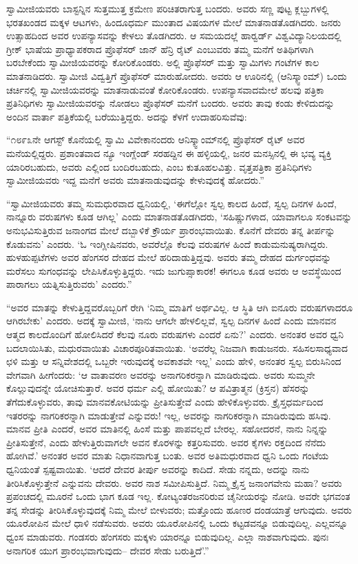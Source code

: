  ಸ್ವಾಮೀಜಿಯವರು ಬಾಸ್ಟನ್ನಿನ ಸುತ್ತಮುತ್ತ ಕ್ರಮೇಣ ಪರಿಚಿತರಾಗುತ್ತ ಬಂದರು. ಅವರು ಸಣ್ಣ ಪುಟ್ಟ ಕ್ಲಬ್ಬುಗಳಲ್ಲಿ ಭರತಖಂಡದ ಮಕ್ಕಳ ಆಟಗಳು, ಹಿಂದೂಧರ್ಮ ಮುಂತಾದ ವಿಷಯಗಳ ಮೇಲೆ ಮಾತನಾಡತೊಡಗಿದರು. ಜನರು ಉತ್ಸಾಹದಿಂದ ಅವರ ಉಪನ್ಯಾಸವನ್ನು ಕೇಳಲು ತೊಡಗಿದರು. ಆ ಸಮಯದಲ್ಲೆ ಹಾರ್‍ವರ್ಡ್ ವಿಶ್ವವಿದ್ಯಾನಿಲಯದಲ್ಲಿ ಗ್ರೀಕ್ ಭಾಷೆಯ ಪ್ರಾಧ್ಯಾಪಕರಾದ ಪ್ರೊಫೆಸರ್ ಜಾನ್ ಹೆನ್ರಿ ರೈಟ್ ಎಂಬುವರು ತಮ್ಮ ಮನೆಗೆ ಅತಿಥಿಗಳಾಗಿ ಬರಬೇಕೆಂದು ಸ್ವಾಮೀಜಿಯವರನ್ನು ಕೋರಿಕೊಂಡರು. ಅಲ್ಲಿ ಪ್ರೊಫೆಸರ್ ಮತ್ತು ಸ್ವಾಮಿಗಳು ಗಂಟೆಗಳ ಕಾಲ ಮಾತನಾಡಿದರು. ಸ್ವಾಮೀಜಿ ವಿದ್ವತ್ತಿಗೆ ಪ್ರೊಫೆಸರ್ ಮಾರುಹೋದರು. ಅವರು ಆ ಊರಿನಲ್ಲಿ (ಆನಿಸ್ಕ್ವಾಂಮ್) ಒಂದು ಚರ್ಚಿನಲ್ಲಿ ಸ್ವಾಮೀಜಿಯವರನ್ನು ಮಾತನಾಡುವಂತೆ ಕೋರಿಕೊಂಡರು. ಉಪನ್ಯಾಸವಾದಮೇಲೆ ಹಲವು ಪತ್ರಿಕಾ ಪ್ರತಿನಿಧಿಗಳು ಸ್ವಾಮೀಜಿಯವರನ್ನು ನೋಡಲು ಪ್ರೊಫೆಸರ್ ಮನೆಗೆ ಬಂದರು. ಅವರು ತಾವು ಕಂಡು ಕೇಳಿದುದನ್ನು ಅಂದಿನ ವಾರ್ತಾ ಪತ್ರಿಕೆಯಲ್ಲಿ ಬರೆಯುತ್ತಿದ್ದರು. ಅದನ್ನು ಕೆಳಗೆ ಉದಾಹರಿಸುವೆವು: 

 “೧೮೯೩ನೇ ಆಗಸ್ಟ್ ಕೊನೆಯಲ್ಲಿ ಸ್ವಾಮಿ ವಿವೇಕಾನಂದರು ಆನಿಸ್ಕ್ವಾಂಮ್‍ನಲ್ಲಿ ಪ್ರೊಫೆಸರ್ ರೈಟ್ ಅವರ ಮನೆಯಲ್ಲಿದ್ದರು. ಪ್ರಶಾಂತವಾದ ನ್ಯೂ ಇಂಗ್ಲೆಂಡ್ ಸರಹದ್ದಿನ ಈ ಹಳ್ಳಿಯಲ್ಲಿ, ಜನರ ಮನಸ್ಸಿನಲ್ಲಿ ಈ ಭವ್ಯ ವ್ಯಕ್ತಿ ಯಾರಿರಬಹುದು, ಅವರು ಎಲ್ಲಿಂದ ಬಂದಿರಬಹುದು, ಎಂಬ ಕುತೂಹಲವಿತ್ತು. ವೃತ್ತಪತ್ರಿಕಾ ಪ್ರತಿನಿಧಿಗಳು ಸ್ವಾಮೀಜಿಯವರು ಇದ್ದ ಮನೆಗೆ ಅವರು ಮಾತನಾಡುವುದನ್ನು ಕೇಳುವುದಕ್ಕೆ ಹೋದರು.” 

 “ಸ್ವಾಮೀಜಿಯವರು ತಮ್ಮ ಸುಮಧುರವಾದ ಧ್ವನಿಯಲ್ಲಿ, ‘ಈಗೆಲ್ಲೋ ಸ್ವಲ್ಪ ಕಾಲದ ಹಿಂದೆ, ಸ್ವಲ್ಪ ದಿನಗಳ ಹಿಂದೆ, ನಾನ್ನೂರು ವರುಷಗಳು ಕೂಡ ಆಗಿಲ್ಲ’ ಎಂದು ಮಾತನಾಡತೊಡಗಿದರು, ‘ಸಹಿಷ್ಣುಗಳಾದ, ಯಾವಾಗಲೂ ಸಂಕಟವನ್ನು ಅನುಭವಿಸುತ್ತಿರುವ ಜನಾಂಗದ ಮೇಲೆ ದಬ್ಬಾಳಿಕೆ ಕ್ರೌರ್ಯ ಪ್ರಾರಂಭವಾಯಿತು. ಕೊನೆಗೆ ದೇವರು ತನ್ನ ತೀರ್ಪನ್ನು ಕೊಡುವನು’ ಎಂದರು. ‘ಓ ಇಂಗ್ಲೀಷಿನವರು, ಅವರೆಲ್ಲೊ ಕೆಲವು ವರುಷಗಳ ಹಿಂದೆ ಕಾಡುಮನುಷ್ಯರಾಗಿದ್ದರು. ಹುಳಹುಪ್ಪಟೆಗಳು ಅವರ ಹೆಂಗಸರ ದೇಹದ ಮೇಲೆ ಹರಿದಾಡುತ್ತಿದ್ದವು. ಅವರು ತಮ್ಮ ದೇಹದ ದುರ್ಗಂಧವನ್ನು ಮರೆಸಲು ಸುಗಂಧವನ್ನು ಲೇಪಿಸಿಕೊಳ್ಳುತ್ತಿದ್ದರು. ಇದು ಜುಗುಪ್ಸಾಕಾರಕ! ಈಗಲೂ ಕೂಡ ಅವರು ಆ ಅವಸ್ಥೆಯಿಂದ ಪಾರಾಗಲು ಯತ್ನಿಸುತ್ತಿರುವರು’ ಎಂದರು.” 

 “ಅವರ ಮಾತನ್ನು ಕೇಳುತ್ತಿದ್ದವರೊಬ್ಬರಿಗೆ ರೇಗಿ ‘ನಿಮ್ಮ ಮಾತಿಗೆ ಅರ್ಥವಿಲ್ಲ. ಆ ಸ್ಥಿತಿ ಆಗಿ ಐನೂರು ವರುಷಗಳಾದರೂ ಆಗಿರಬೇಕು’ ಎಂದರು. ಅದಕ್ಕೆ ಸ್ವಾಮೀಜಿ, ‘ನಾನು ಆಗಲೇ ಹೇಳಲಿಲ್ಲವೆ, ಸ್ವಲ್ಪ ದಿನಗಳ ಹಿಂದೆ ಎಂದು ಮಾನವನ ಆತ್ಮದ ಕಾಲದೊಂದಿಗೆ ಹೋಲಿಸಿದರೆ ಕೆಲವು ನೂರು ವರುಷಗಳು ಎಂದರೆ ಏನು?’ ಎಂದರು. ಅನಂತರ ಅವರ ಧ್ವನಿ ಬದಲಾಯಿಸಿತು, ಮಧುರವಾಯಿತು ವಿಚಾರಪೂರಿತವಾಯಿತು. ‘ಅವರೆಲ್ಲ ನಿಜವಾಗಿ ಕಾಡುಜನರು. ಸಹಿಸಲಸಾಧ್ಯವಾದ ಛಳಿ ಮತ್ತು ಆ ಸನ್ನಿವೇಶದಲ್ಲಿ ಒಬ್ಬರೇ ಇರುವುದಕ್ಕೆ ಅವಕಾಶವೇ ಇಲ್ಲ’ ಎಂದು ಹೇಳಿ, ಅನಂತರ ಸ್ವಲ್ಪ ಬಿರುಸಿನಿಂದ ವೇಗವಾಗಿ ಹೀಗೆಂದರು: ‘ಆ ವಾತಾವರಣ ಅವರನ್ನು ಅನಾಗರಿಕರನ್ನಾಗಿ ಮಾಡಿರುವುದು. ಅವರು ಸುಮ್ಮನೇ ಕೊಲ್ಲುವುದನ್ನೇ ಯೋಚಿಸುತ್ತಾರೆ. ಅವರ ಧರ್ಮ ಎಲ್ಲಿ ಹೋಯಿತು? ಆ ಪವಿತ್ರಾತ್ಮನ (ಕ್ರಿಸ್ತನ) ಹೆಸರನ್ನು ತೆಗೆದುಕೊಳ್ಳುವರು, ತಾವು ಮಾನವಕೋಟಿಯನ್ನು ಪ್ರೀತಿಸುತ್ತೇವೆ ಎಂದು ಹೇಳಿಕೊಳ್ಳುವರು. ಕ್ರೈಸ್ತಧರ್ಮದಿಂದ ಇತರರನ್ನು ನಾಗರಿಕರನ್ನಾಗಿ ಮಾಡುತ್ತೇವೆ ಎನ್ನುವರು! ಇಲ್ಲ, ಅವರನ್ನು ನಾಗರಿಕರನ್ನಾಗಿ ಮಾಡಿರುವುದು ಹಸಿವು. ಮಾನವ ಪ್ರೀತಿ ಎಂದರೆ, ಅವರ ಮಾತಿನಲ್ಲಿ ಹಿಂಸೆ ಮತ್ತು ಪಾಪವಲ್ಲದೆ ಬೇರಲ್ಲ. ಸಹೋದರನೆ, ನಾನು ನಿನ್ನನ್ನು ಪ್ರೀತಿಸುತ್ತೇನೆ, ಎಂದು ಹೇಳುತ್ತಿರುವಾಗಲೇ ಅವನ ಕೊರಳನ್ನು ಕತ್ತರಿಸುವರು. ಅವರ ಕೈಗಳು ರಕ್ತದಿಂದ ನೆನೆದು ಹೋಗಿವೆ.’ ಅನಂತರ ಅವರ ಮಾತು ನಿಧಾನವಾಗುತ್ತ ಬಂತು. ಅವರ ಅತಿಮಧುರವಾದ ಧ್ವನಿ ಒಂದು ಗಂಟೆಯ ಧ್ವನಿಯಂತೆ ಸ್ಪಷ್ಟವಾಯಿತು. ‘ಆದರೆ ದೇವರ ತೀರ್ಪು ಅವರನ್ನು ಕಾದಿದೆ. ಸೇಡು ನನ್ನದು, ಅದನ್ನು ನಾನು ತೀರಿಸಿಕೊಳ್ಳುತ್ತೇನೆ ಎನ್ನುವನು ದೇವರು. ಅವರ ನಾಶ ಸಮೀಪಿಸುತ್ತಿದೆ. ನಿಮ್ಮ ಕ್ರೈಸ್ತ ಜನಾಂಗವೇನು ಮಹಾ? ಅವರು ಪ್ರಪಂಚದಲ್ಲಿ ಮೂರನೆ ಒಂದು ಭಾಗ ಕೂಡ ಇಲ್ಲ. ಕೋಟ್ಯಂತರ\break ಜನರಿರುವ ಚೈನೀಯರನ್ನು ನೋಡಿ. ಅವರೇ ಭಗವಂತ ತನ್ನ ಸೇಡನ್ನು ತೀರಿಸಿಕೊಳ್ಳುವುದಕ್ಕೆ ನಿಮ್ಮ ಮೇಲೆ ಬೀಳುವರು; ಮತ್ತೊಂದು ಹೂಣರ ದಂಡಯಾತ್ರೆ ಆಗುವುದು. ಅವರು ಯೂರೋಪಿನ ಮೇಲೆ ಧಾಳಿ ನಡೆಸುವರು. ಅವರು ಯೂರೋಪಿನಲ್ಲಿ ಒಂದು ಕಟ್ಟಡವನ್ನೂ ಬಿಡುವುದಿಲ್ಲ. ಎಲ್ಲವನ್ನೂ ಧ್ವಂಸ ಮಾಡುವರು. ಗಂಡಸರು ಹೆಂಗಸರು ಮಕ್ಕಳು ಯಾರನ್ನೂ ಬಿಡುವುದಿಲ್ಲ. ಎಲ್ಲಾ ನಾಶವಾಗುವುದು. ಪುನಃ ಅನಾಗರಿಕ ಯುಗ ಪ್ರಾರಂಭವಾಗುವುದು– ದೇವರ ಸೇಡು ಬರುತ್ತಿದೆ’.” 

